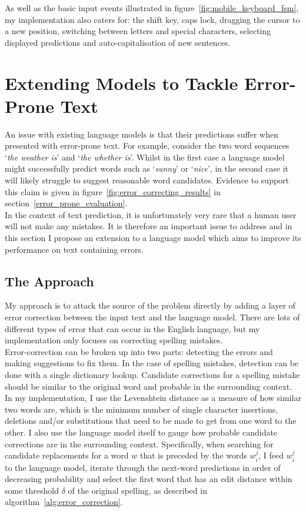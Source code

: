 \documentclass[a4paper, 12pt]{report}
\newcommand{\tit}[1]{\textit{#1}}
\begin{document}
As well as the basic input events illustrated in figure~\ref{fig:mobile_keyboard_fsm}, my implementation also caters for: the shift key, caps lock, dragging the cursor to a new position, switching between letters and special characters, selecting displayed predictions and auto-capitalisation of new sentences.

\section{Extending Models to Tackle Error-Prone Text} \label{error_correcting_lm}

An issue with existing language models is that their predictions suffer when presented with error-prone text. For example, consider the two word sequences `\tit{the weather is}' and `\tit{the whether is}'. Whilst in the first case a language model might successfully predict words such as `\tit{sunny}' or `\tit{nice}', in the second case it will likely struggle to suggest reasonable word candidates. Evidence to support this claim is given in figure~\ref{fig:error_correcting_results} in section~\ref{error_prone_evaluation}. \\

In the context of text prediction, it is unfortunately very rare that a human user will not make any mistakes. It is therefore an important issue to address and in this section I propose an extension to a language model which aims to improve its performance on text containing errors.

\subsection{The Approach}

My approach is to attack the source of the problem directly by adding a layer of error correction between the input text and the language model. There are lots of different types of error that can occur in the English language, but my implementation only focuses on correcting spelling mistakes. \\

Error-correction can be broken up into two parts: detecting the errors and making suggestions to fix them. In the case of spelling mistakes, detection can be done with a single dictionary lookup. Candidate corrections for a spelling mistake should be similar to the original word and probable in the surrounding context. In my implementation, I use the Levenshtein distance as a measure of how similar two words are, which is the minimum number of single character insertions, deletions and/or substitutions that need to be made to get from one word to the other. I also use the language model itself to gauge how probable candidate corrections are in the surrounding context. Specifically, when searching for candidate replacements for a word $w$ that is preceded by the words $w_i^j$, I feed $w_i^j$ to the language model, iterate through the next-word predictions in order of decreasing probability and select the first word that has an edit distance within some threshold $\delta$ of the original spelling, as described in algorithm~\ref{alg:error_correction}. \\
\end{document}
